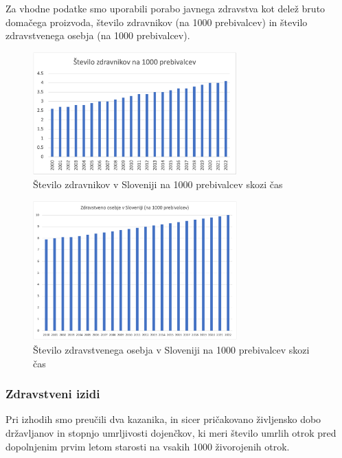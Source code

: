 \documentclass[12pt,a4paper]{article}
\theoremstyle{definition}
\begin{document}
Za vhodne podatke smo uporabili porabo javnega zdravstva kot delež bruto domačega proizvoda, 
število zdravnikov (na 1000 prebivalcev) in število zdravstvenega osebja (na 1000 prebivalcev).

\begin{figure}[H]
    \centering
    \includegraphics[width=0.7\textwidth]{zdravniki_1000_slo.png}
    \caption{Število zdravnikov v Sloveniji na 1000 prebivalcev skozi čas}
    \label{fig:zdravniki_1000_slo.png}
  \end{figure}

  \begin{figure}[H]
    \centering
    \includegraphics[width=0.7\textwidth]{zdr_osebje_1000_slo.png}
    \caption{Število zdravstvenega osebja v Sloveniji na 1000 prebivalcev skozi čas}
    \label{fig:zdr_osebje_1000_slo.png}
  \end{figure}

\subsubsection{Zdravstveni izidi}

Pri izhodih smo preučili dva kazanika, in sicer pričakovano življensko dobo državljanov in stopnjo umrljivosti dojenčkov, ki meri število umrlih otrok pred dopolnjenim prvim letom starosti na vsakih 1000 živorojenih otrok.
\end{document}
